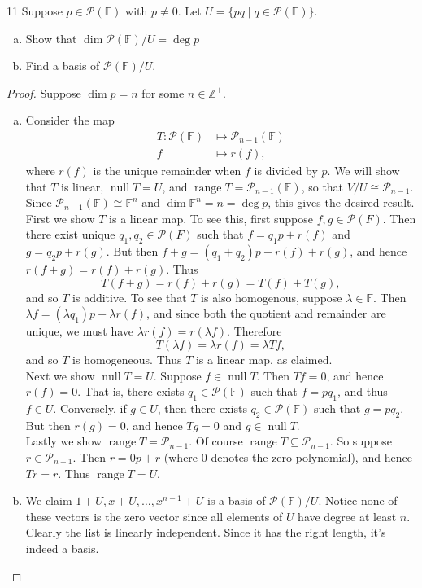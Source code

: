 \documentclass{extarticle}
\newenvironment{problem}[1]{\begin{prob*}{#1}{}}{\end{prob*}}
\newcommand{\Z}{\mathbb{Z}}
\newcommand{\F}{\mathbb{F}}
\newcommand{\poly}{\mathcal{P}}
\DeclareMathOperator{\Null}{null}
\DeclareMathOperator{\Range}{range}
\begin{document}
\begin{problem}{11}
Suppose $p\in\poly(\F)$ with $p\neq 0$.  Let $U=\{pq\mid q\in\poly(\F)\}$.
\begin{enumerate}[(a)]
\item Show that $\dim\poly(\F)/U = \deg p$
\item Find a basis of $\poly(\F)/U$.
\end{enumerate}
\end{problem}
\begin{proof}
Suppose $\dim p=n$ for some $n\in\Z^+$.
\begin{enumerate}[(a)]
\item Consider the map
\begin{align*}
T:\poly(\F) &\mapsto \poly_{n-1}(\F)\\
f &\mapsto r(f),
\end{align*}
where $r(f)$ is the unique remainder when $f$ is divided by $p$.  We will show that $T$ is linear, $\Null T = U$, and $\Range T = \poly_{n - 1}(\F)$, so that $V/U\cong \poly_{n - 1}$.  Since $\poly_{n-1}(\F)\cong \F^n$ and $\dim\F^n = n = \deg p$, this gives the desired result.
\indent First we show $T$ is a linear map.  To see this, first suppose $f,g\in\poly(F)$.  Then there exist unique $q_1,q_2\in\poly(F)$ such that $f = q_1p + r(f)$ and $g = q_2p + r(g)$.  But then $f + g = (q_1 + q_2)p + r(f) + r(g)$, and hence $r(f+g) = r(f)+r(g)$.  Thus
\begin{equation*}
T(f + g) = r(f) + r(g) = T(f) + T(g),
\end{equation*}
and so $T$ is additive.  To see that $T$ is also homogenous, suppose $\lambda\in\F$.  Then $\lambda f = (\lambda q_1)p + \lambda r(f)$, and since both the quotient and remainder are unique, we must have $\lambda r(f) = r(\lambda f)$.  Therefore
\begin{equation*}
T(\lambda f) = \lambda r(f) = \lambda Tf,
\end{equation*}
and so $T$ is homogeneous.  Thus $T$ is a linear map, as claimed.\\
\indent Next we show $\Null T= U$.  Suppose $f\in \Null T$.  Then $Tf = 0$, and hence $r(f) = 0$.  That is, there exists $q_1\in \poly(\F)$ such that $f = pq_1$, and thus $f\in U$.  Conversely, if $g\in U$, then there exists $q_2\in\poly(\F)$ such that $g = pq_2$.  But then $r(g)=0$, and hence $Tg =0$ and $g\in\Null T$.\\
\indent Lastly we show $\Range T = \poly_{n-1}$.  Of course $\Range T\subseteq \poly_{n-1}$.  So suppose $r \in \poly_{n-1}$.  Then $r = 0p + r$ (where $0$ denotes the zero polynomial), and hence $Tr = r$.  Thus $\Range T = U$.
\item We claim $1+U, x+U,\dots, x^{n-1}+U$ is a basis of $\poly(\F)/U$.  Notice none of these vectors is the zero vector since all elements of $U$ have degree at least $n$.  Clearly the list is linearly independent.  Since it has the right length, it's indeed a basis.  \qedhere
\end{enumerate}
\end{proof}
\end{document}
